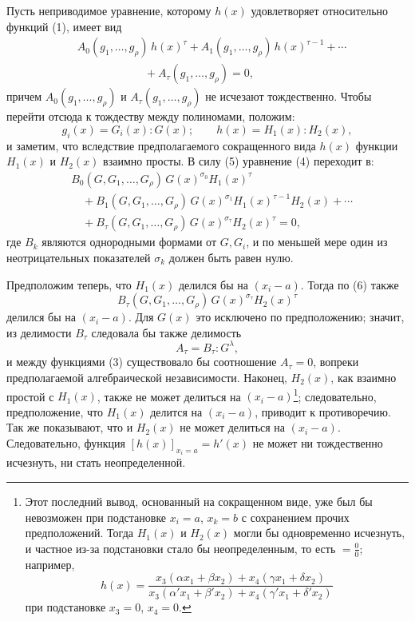 \documentclass[11pt]{article}
\begin{document}
Пусть неприводимое уравнение, которому $h(x)$ удовлетворяет относительно функций (1), имеет вид
\begin{equation}
\begin{aligned}
&A_0(g_1,\ldots,g_\rho)\,h(x)^\tau
 +A_1(g_1,\ldots,g_\rho)\,h(x)^{\tau-1}
 +\cdots \\
&\hspace{6em}+A_\tau(g_1,\ldots,g_\rho)=0,
\end{aligned}
\tag{4}
\end{equation}
причем $A_0(g_1,\ldots,g_\rho)$ и $A_\tau(g_1,\ldots,g_\rho)$ не исчезают тождественно. Чтобы перейти отсюда к тождеству между полиномами, положим:
\begin{equation}
  g_i(x)=G_i(x):G(x);\qquad h(x)=H_1(x):H_2(x),
\tag{5}
\end{equation}
и заметим, что вследствие предполагаемого сокращенного вида $h(x)$ функции $H_1(x)$ и $H_2(x)$ взаимно просты. В силу (5) уравнение (4) переходит в:
\begin{equation}
\begin{aligned}
&B_0(G,G_1,\ldots,G_\rho)\,G(x)^{\sigma_0}H_1(x)^\tau \\
&\quad+B_1(G,G_1,\ldots,G_\rho)\,G(x)^{\sigma_1}H_1(x)^{\tau-1}H_2(x)+\cdots \\
&\quad+B_\tau(G,G_1,\ldots,G_\rho)\,G(x)^{\sigma_\tau}H_2(x)^\tau=0,
\end{aligned}
\tag{6}
\end{equation}
где $B_k$ являются однородными формами от $G,G_i$, и по меньшей мере один из неотрицательных показателей $\sigma_k$ должен быть равен нулю.

Предположим теперь, что $H_1(x)$ делился бы на $(x_i-a)$. Тогда по (6) также
\[
  B_\tau(G,G_1,\ldots,G_\rho)\,G(x)^{\sigma_\tau}H_2(x)^\tau
\]
делился бы на $(x_i-a)$. Для $G(x)$ это исключено по предположению; значит, из делимости $B_\tau$ следовала бы также делимость
\[
  A_\tau=B_\tau:G^\lambda,
\]
и между функциями (3) существовало бы соотношение $A_\tau=0$, вопреки предполагаемой алгебраической независимости. Наконец, $H_2(x)$, как взаимно простой с $H_1(x)$, также не может делиться на $(x_i-a)$\footnote{Этот последний вывод, основанный на сокращенном виде, уже был бы невозможен при подстановке $x_i=a$, $x_k=b$ с сохранением прочих предположений. Тогда $H_1(x)$ и $H_2(x)$ могли бы одновременно исчезнуть, и частное из-за подстановки стало бы неопределенным, то есть $=\frac{0}{0}$; например,
\[
 h(x)=\frac{x_3(\alpha x_1+\beta x_2)+x_4(\gamma x_1+\delta x_2)}
 {x_3(\alpha' x_1+\beta' x_2)+x_4(\gamma' x_1+\delta' x_2)}
\]
при подстановке $x_3=0$, $x_4=0$.}; следовательно, предположение, что $H_1(x)$ делится на $(x_i-a)$, приводит к противоречию. Так же показывают, что и $H_2(x)$ не может делиться на $(x_i-a)$. Следовательно, функция $[h(x)]_{x_i=a}=h'(x)$ не может ни тождественно исчезнуть, ни стать неопределенной.
\end{document}
